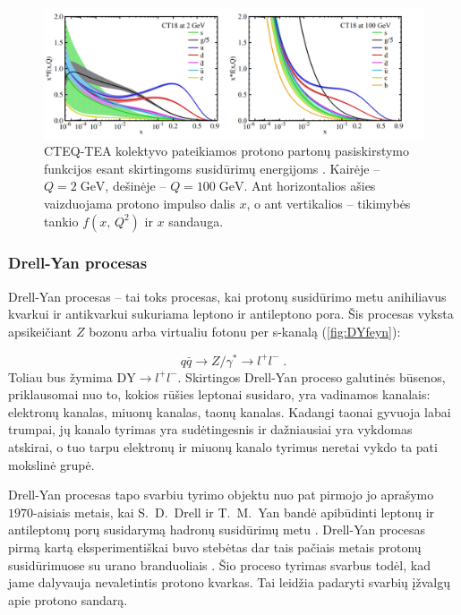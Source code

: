 \documentclass[a4paper, 12pt, oneside]{article}
\newcommand{\DY}{\mathrm{DY}}
\newlength\q
\begin{document}
\begin{figure} \centering
	\includegraphics[width=\linewidth]{CT18_PDF.png}
	\caption{\label{fig:PDFs}
		CTEQ-TEA kolektyvo pateikiamos protono partonų pasiskirstymo funkcijos esant skirtingoms susidūrimų energijoms \cite{CTEQ2019}.
		Kairėje -- $Q=2 \; \mathrm{GeV}$, dešinėje -- $Q=100 \; \mathrm{GeV}$.
		Ant horizontalios ašies vaizduojama protono impulso dalis $x$, o ant vertikalios -- tikimybės tankio $f(x,\, Q^2)$
		ir $x$ sandauga.}
\end{figure}

\subsubsection{Drell-Yan procesas}

Drell-Yan procesas \cite{DYoriginal} -- tai toks procesas, kai protonų susidūrimo metu anihiliavus kvarkui ir antikvarkui
sukuriama leptono ir antileptono pora.
Šis procesas vyksta apsikeičiant $Z$ bozonu arba virtualiu fotonu per s-kanalą (\ref{fig:DYfeyn}):

\begin{equation*}
	q\bar{q} \rightarrow Z/ \gamma^{*} \rightarrow l^{+}l^{-} \; .
\end{equation*}
Toliau bus žymima $\DY \! \rightarrow \! l^{+}l^{-}$.
Skirtingos Drell-Yan proceso galutinės būsenos, priklausomai nuo to, kokios rūšies leptonai susidaro, yra
vadinamos kanalais: elektronų kanalas, miuonų kanalas, taonų kanalas.
Kadangi taonai gyvuoja labai trumpai, jų kanalo tyrimas yra sudėtingesnis ir dažniausiai yra vykdomas atskirai,
o tuo tarpu elektronų ir miuonų kanalo tyrimus neretai vykdo ta pati mokslinė grupė.

Drell-Yan procesas tapo svarbiu tyrimo objektu nuo pat pirmojo jo aprašymo $1970$-aisiais
metais, kai S.\ D.\ Drell ir T.\ M.\ Yan bandė apibūdinti leptonų ir antileptonų porų susidarymą
hadronų susidūrimų metu \cite{DYoriginal}.
Drell-Yan procesas pirmą kartą eksperimentiškai buvo stebėtas dar tais pačiais metais protonų susidūrimuose
su urano branduoliais \cite{DY_firstExp}.
Šio proceso tyrimas svarbus todėl, kad jame dalyvauja nevaletintis protono kvarkas.
Tai leidžia padaryti svarbių įžvalgų apie protono sandarą.
\end{document}
